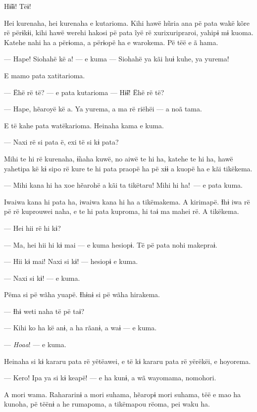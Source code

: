 Hɨ̃ɨɨ! Tëɨ! 

Hei kurenaha, hei kurenaha e kutarioma. Kihi hawë hũria ana pë pata wakë
kõre rë përɨkɨi, kihi hawë werehi hakosi pë pata ĩyë rë xurixuripraroi,
yahipɨ mɨ kuoma. Katehe nahi ha a përɨoma, a përɨopë ha e warokema. Pë
tëë e ã hama. 

--- Hape! Siohahë kë a! --- e kuma --- Siohahë ya kãi huɨ kuhe, ya yurema! 

E mamo pata xatitarioma. 

--- Ëhë rë të? --- e pata kutarioma --- Hɨ̃ɨ! Ëhë rë të? 

--- Hape, hẽaroyë kë a. Ya yurema, a ma rë riëhëi --- a noã tama. 

E të kahe pata watëkarioma. Heinaha kama e kuma. 


--- Naxi rë si pata ë, exi të si kɨ pata? 

Mihi te hi rë kurenaha, ɨ̃naha kuwë, no aiwë te hi ha, katehe te hi ha,
hawë yahetipa kë kɨ sipo rë kure te hi pata praopë ha pë xɨɨ a kuopë ha
e kãi tikëkema. 

--- Mihi kana hi ha xoe hẽarohë a kãi ta tikëtaru! Mihi hi ha!~--- e pata
kuma. 

Iwaiwa kana hi pata ha, iwaiwa kana hi ha a tikëmakema. A kirimapë. Ɨhɨ
iwa rë pë rë kuprouwei naha, e te hi pata kuproma, hi taɨ ma mahei rë. A tikëkema. 

--- Hei hii rë hi kɨ? 

--- Ma, hei hii hi kɨ mai --- e kuma hesiopɨ. Të pë pata nohi makepraɨ. 

--- Hii kɨ mai! Naxi si kɨ! --- hesiopɨ e kuma. 

--- Naxi si kɨ! --- e kuma. 

Pëma si pë wãha yuapë. Ɨhɨnɨ si pë wãha hirakema. 

--- Ɨhɨ weti naha të pë taɨ? 

--- Kihi ko ha kë anɨ, a ha rãanɨ, a waɨ --- e kuma. 

--- \textit{Hoaa}! --- e kuma. 

Heinaha si kɨ kararu pata rë yëtëawei, e të kɨ kararu pata rë yërëkëi, e
hoyorema. 

--- Kero! Ipa ya si kɨ keapë! --- e ha kunɨ, a wã wayomama, nomohori. 

A mori wama. Rahararinɨ a mori suhama, hẽaropɨ mori suhama, tëë e mao ha
kunoha, pë tëënɨ a he rumapoma, a tikëmapou rëoma, pei waku ha. 

